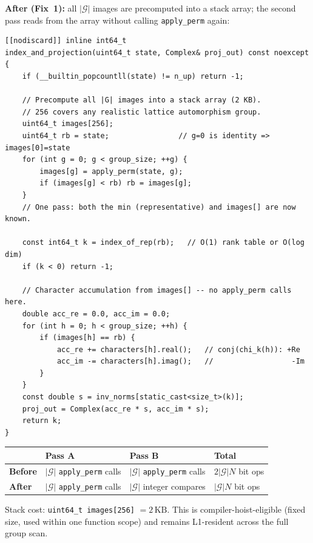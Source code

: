 \documentclass[11pt,a4paper]{article}
\begin{document}
\textbf{After (Fix~1):} all $|\mathcal{G}|$ images are precomputed into a
stack array; the second pass reads from the array without calling
\texttt{apply\_perm} again:

\begin{lstlisting}[caption={Fused single-scan approach (Fix 1, rep\_symmetry\_basis\_policy.h)}]
[[nodiscard]] inline int64_t
index_and_projection(uint64_t state, Complex& proj_out) const noexcept {
    if (__builtin_popcountll(state) != n_up) return -1;

    // Precompute all |G| images into a stack array (2 KB).
    // 256 covers any realistic lattice automorphism group.
    uint64_t images[256];
    uint64_t rb = state;                // g=0 is identity => images[0]=state
    for (int g = 0; g < group_size; ++g) {
        images[g] = apply_perm(state, g);
        if (images[g] < rb) rb = images[g];
    }
    // One pass: both the min (representative) and images[] are now known.

    const int64_t k = index_of_rep(rb);   // O(1) rank table or O(log dim)
    if (k < 0) return -1;

    // Character accumulation from images[] -- no apply_perm calls here.
    double acc_re = 0.0, acc_im = 0.0;
    for (int h = 0; h < group_size; ++h) {
        if (images[h] == rb) {
            acc_re += characters[h].real();   // conj(chi_k(h)): +Re
            acc_im -= characters[h].imag();   //                  -Im
        }
    }
    const double s = inv_norms[static_cast<size_t>(k)];
    proj_out = Complex(acc_re * s, acc_im * s);
    return k;
}
\end{lstlisting}

\begin{center}
\begin{tabular}{@{}llll@{}}
\toprule
 & Pass A & Pass B & Total \\
\midrule
\textbf{Before} & $|\mathcal{G}|$ \texttt{apply\_perm} calls & $|\mathcal{G}|$ \texttt{apply\_perm} calls & $2|\mathcal{G}|N$ bit ops \\
\textbf{After}  & $|\mathcal{G}|$ \texttt{apply\_perm} calls & $|\mathcal{G}|$ integer compares & $|\mathcal{G}|N$ bit ops \\
\bottomrule
\end{tabular}
\end{center}

Stack cost: \texttt{uint64\_t images[256]} $= 2\,\mathrm{KB}$.  This is
compiler-hoist-eligible (fixed size, used within one function scope) and
remains L1-resident across the full group scan.
\end{document}
